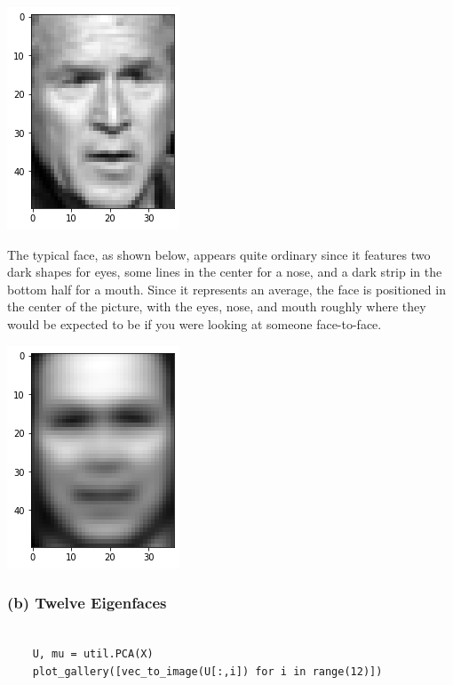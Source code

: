 \documentclass[11pt]{article}
\newcommand{\sol}[1]{{\bf{\color{magenta}{{Solution:}}}}}
\begin{document}
\begin{center}
    \includegraphics[scale=0.6]{1a-3.png}
\end{center}

The typical face, as shown below, appears quite ordinary since it features two dark shapes for eyes, some lines in the center for a nose, and a dark strip in the bottom half for a mouth. Since it represents an average, the face is positioned in the center of the picture, with the eyes, nose, and mouth roughly where they would be expected to be if you were looking at someone face-to-face.

\begin{center}
    \includegraphics[scale=0.6]{1a-4.png}
\end{center}

\subsubsection{(b) Twelve Eigenfaces}
\sol x 
\begin{verbatim}

    U, mu = util.PCA(X)
    plot_gallery([vec_to_image(U[:,i]) for i in range(12)])
        
\end{verbatim}
\end{document}
